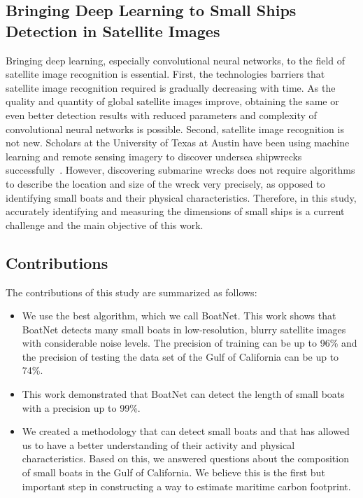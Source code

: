\subsection{Bringing Deep Learning to Small Ships Detection in Satellite Images}
Bringing deep learning, especially convolutional neural networks, to the field of satellite image recognition is essential. First, the technologies barriers that satellite image recognition required is gradually decreasing with time. As the quality and quantity of global satellite images improve, obtaining the same or even better detection results with reduced parameters and complexity of convolutional neural networks is possible. Second, satellite image recognition is not new. Scholars at the University of Texas at Austin have been using machine learning and remote sensing imagery to discover undersea shipwrecks successfully~\cite{character2021archaeologic}. However, discovering submarine wrecks does not require algorithms to describe the location and size of the wreck very precisely, as opposed to identifying small boats and their physical characteristics. Therefore, in this study, accurately identifying and measuring the dimensions of small ships is a current challenge and the main objective of this work.


\subsection{Contributions}
The contributions of this study are summarized as follows:
\begin{itemize}
    \item We use the best algorithm, which we call BoatNet. This work shows that BoatNet detects many small boats in low-resolution, blurry satellite images with considerable noise levels. The precision of training can be up to 96\% and the precision of testing the data set of the Gulf of California can be up to 74\%.

    \item This work demonstrated that BoatNet can detect the length of small boats with a precision up to 99\%.

    \item We created a methodology that can detect small boats and that has allowed us to have a better understanding of their activity and physical characteristics. Based on this, we answered questions about the composition of small boats in the Gulf of California. We believe this is the first but important step in constructing a way to estimate maritime carbon footprint.
\end{itemize}